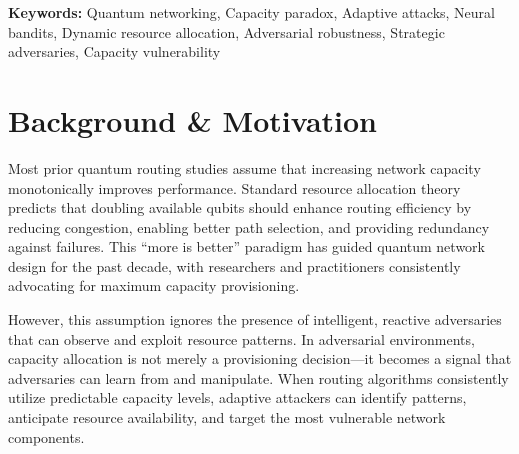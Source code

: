 \documentclass[11pt,a4paper]{article}
\newcommand{\critical}[1]{\textcolor{criticalcolor}{\textbf{#1}}}
\begin{document}
\begin{abstract}
\textbf{Production Implications:} (1) Deploy environment-aware dynamic capacity that scales UP for predictable attacks (Markov) and DOWN for reactive adversaries (Adaptive). (2) Hardcoded 2T capacity is a \critical{deployment vulnerability} in adversarial environments (-22 to -30\% penalties). (3) DynamicUCBAllocator shows consistent positive results across both T and 2T (context models: +26.5pp @ T, +13.8pp @ 2T) because it adapts capacity continuously.

\textbf{Impact:} This work fundamentally challenges the ``more capacity = better performance'' assumption in quantum networking, revealing that \textit{adaptive capacity intelligence} matters more than absolute resource availability. The Capacity Paradox extends to any multi-armed bandit system with resource constraints facing intelligent adversaries.

\end{abstract}

\vspace{0.3cm}

\noindent\textbf{Keywords:} Quantum networking, Capacity paradox, Adaptive attacks, Neural bandits, Dynamic resource allocation, Adversarial robustness, Strategic adversaries, Capacity vulnerability

\newpage

{\small\tableofcontents}

\newpage

\section{Background \& Motivation}

Most prior quantum routing studies assume that increasing network capacity monotonically improves performance. Standard resource allocation theory predicts that doubling available qubits should enhance routing efficiency by reducing congestion, enabling better path selection, and providing redundancy against failures. This ``more is better'' paradigm has guided quantum network design for the past decade, with researchers and practitioners consistently advocating for maximum capacity provisioning.

However, this assumption ignores the presence of intelligent, reactive adversaries that can observe and exploit resource patterns. In adversarial environments, capacity allocation is not merely a provisioning decision—it becomes a signal that adversaries can learn from and manipulate. When routing algorithms consistently utilize predictable capacity levels, adaptive attackers can identify patterns, anticipate resource availability, and target the most vulnerable network components.
\end{document}
